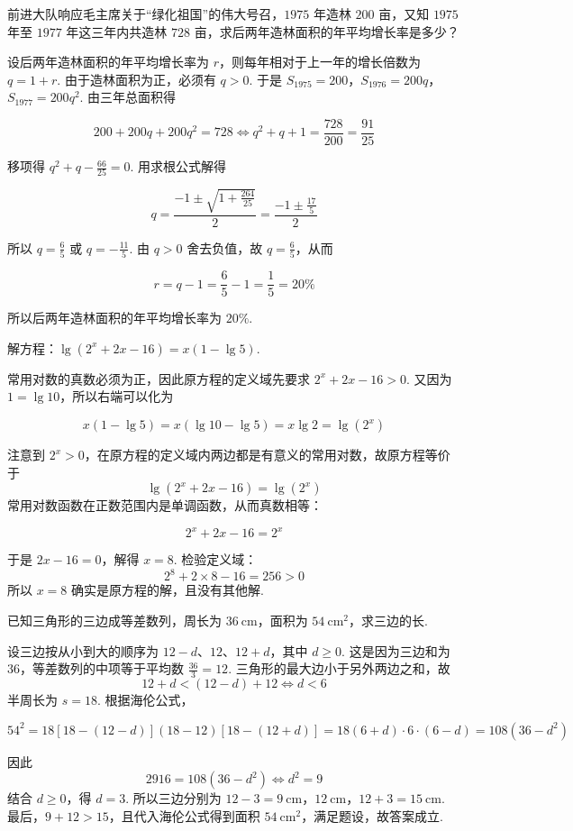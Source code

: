 \begin{problem}
前进大队响应毛主席关于“绿化祖国”的伟大号召，\(1975\) 年造林 \(200\text{ 亩}\)，又知 \(1975\) 年至 \(1977\) 年这三年内共造林 \(728\text{ 亩}\)，求后两年造林面积的年平均增长率是多少？
\end{problem}

\begin{solution}
设后两年造林面积的年平均增长率为 \(r\)，则每年相对于上一年的增长倍数为 \(q=1+r\). 由于造林面积为正，必须有 \(q>0\). 于是
\(S_{1975}=200\)，\(S_{1976}=200q\)，\(S_{1977}=200q^2\).
由三年总面积得

\[
200+200q+200q^2=728
\Longleftrightarrow q^2+q+1=\frac{728}{200}=\frac{91}{25}
\]

移项得 \(q^2+q-\frac{66}{25}=0\). 用求根公式解得


\[
q=\frac{-1\pm\sqrt{1+\frac{264}{25}}}{2}
=\frac{-1\pm\frac{17}{5}}{2}
\]

所以 \(q=\frac65\) 或 \(q=-\frac{11}{5}\). 由 \(q>0\) 舍去负值，故 \(q=\frac65\)，从而

\[
r=q-1=\frac65-1=\frac15=20\%
\]

所以后两年造林面积的年平均增长率为 \(20\%\).
\end{solution}

\begin{problem}
解方程：\(\lg\left(2^x+2x-16\right)=x\left(1-\lg 5\right)\).
\end{problem}

\begin{solution}
常用对数的真数必须为正，因此原方程的定义域先要求 \(2^x+2x-16>0\). 又因为 \(1=\lg10\)，所以右端可以化为

\[
x(1-\lg5)=x(\lg10-\lg5)=x\lg2=\lg(2^x)
\]

注意到 \(2^x>0\)，在原方程的定义域内两边都是有意义的常用对数，故原方程等价于
\[
\lg\left(2^x+2x-16\right)=\lg(2^x)
\]
常用对数函数在正数范围内是单调函数，从而真数相等：

\[
2^x+2x-16=2^x
\]

于是 \(2x-16=0\)，解得 \(x=8\). 检验定义域：
\[
2^8+2\times8-16=256>0
\]
所以 \(x=8\) 确实是原方程的解，且没有其他解.
\end{solution}

\begin{problem}
已知三角形的三边成等差数列，周长为 \(36 \mathrm{~cm}\)，面积为 \(54 \mathrm{~cm}^2\)，求三边的长.
\end{problem}

\begin{solution}
设三边按从小到大的顺序为 \(12-d\)、\(12\)、\(12+d\)，其中 \(d\geqslant0\). 这是因为三边和为 \(36\)，等差数列的中项等于平均数 \(\frac{36}{3}=12\). 三角形的最大边小于另外两边之和，故
\[
12+d<(12-d)+12\Longleftrightarrow d<6
\]
半周长为 \(s=18\). 根据海伦公式，

\[
54^2=18\left[18-(12-d)\right](18-12)\left[18-(12+d)\right]
 =18(6+d)\cdot6\cdot(6-d)=108(36-d^2)
\]

因此
\[
2916=108(36-d^2)\Longleftrightarrow d^2=9
\]
结合 \(d\geqslant0\)，得 \(d=3\). 所以三边分别为
\(12-3=9\mathrm{~cm}\)，\(12\mathrm{~cm}\)，\(12+3=15\mathrm{~cm}\).
最后，\(9+12>15\)，且代入海伦公式得到面积 \(54\mathrm{~cm}^2\)，满足题设，故答案成立.
\end{solution}

